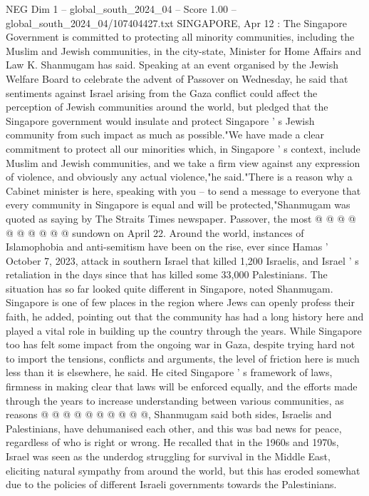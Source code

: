 \begin{textsample}{NEG Dim 1 – global\_south\_2024\_04 – Score 1.00 – global\_south\_2024\_04/107404427.txt}  \label{ex:f1_neg_304}
SINGAPORE, Apr 12 : The Singapore Government is committed to protecting all minority communities, including the Muslim and Jewish communities, in the city-state, Minister for Home Affairs and Law K.
Shanmugam has said.
Speaking at an event organised by the Jewish Welfare Board to celebrate the advent of Passover on Wednesday, he said that sentiments against Israel arising from the Gaza conflict could affect the perception of Jewish communities around the world, but pledged that the Singapore government would insulate and protect Singapore ' s Jewish community from such impact as much as possible."We have made a clear commitment to protect all our minorities which, in Singapore ' s context, include Muslim and Jewish communities, and we take a firm view against any expression of violence, and obviously any actual violence,"he said."There is a reason why a Cabinet minister is here, speaking with you -- to send a message to everyone that every community in Singapore is equal and will be protected,"Shanmugam was quoted as saying by The Straits Times newspaper.
Passover, the most @ @ @ @ @ @ @ @ @ @ sundown on April 22.
Around the world, instances of Islamophobia and anti-semitism have been on the rise, ever since Hamas ' October 7, 2023, attack in southern Israel that killed 1,200 Israelis, and Israel ' s retaliation in the days since that has killed some 33,000 Palestinians.
The situation has so far looked quite different in Singapore, noted Shanmugam.
Singapore is one of few places in the region where Jews can openly profess their faith, he added, pointing out that the community has had a long history here and played a vital role in building up the country through the years.
While Singapore too has felt some impact from the ongoing war in Gaza, despite trying hard not to import the tensions, conflicts and arguments, the level of friction here is much less than it is elsewhere, he said.
He cited Singapore ' s framework of laws, firmness in making clear that laws will be enforced equally, and the efforts made through the years to increase understanding between various communities, as reasons @ @ @ @ @ @ @ @ @ @, Shanmugam said both sides, Israelis and Palestinians, have dehumanised each other, and this was bad news for peace, regardless of who is right or wrong.
He recalled that in the 1960s and 1970s, Israel was seen as the underdog struggling for survival in the Middle East, eliciting natural sympathy from around the world, but this has eroded somewhat due to the policies of different Israeli governments towards the Palestinians.

\end{textsample}
